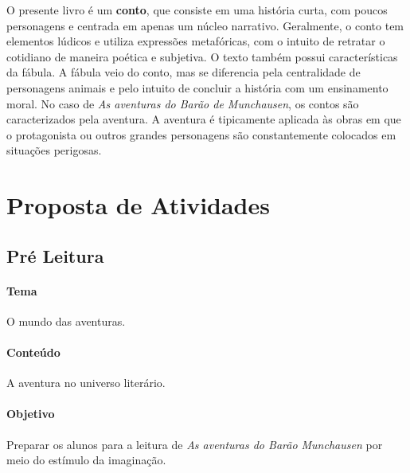 \documentclass[11pt]{extarticle}
\begin{document}
O presente livro é um \textbf{conto}, que consiste em uma história curta, com poucos personagens e centrada em apenas um núcleo narrativo. Geralmente, o conto tem elementos lúdicos e utiliza expressões metafóricas, com o intuito de retratar o cotidiano de maneira poética e subjetiva. O texto também possui características da fábula. A fábula veio do conto, mas se diferencia pela centralidade de personagens animais e pelo intuito de concluir a história com um ensinamento moral. No caso de \textit{As aventuras do Barão de Munchausen}, os contos são caracterizados pela aventura. A aventura é tipicamente aplicada às obras em que o protagonista ou outros grandes personagens são constantemente colocados em situações perigosas. 


\section{Proposta de Atividades}
\subsection{Pré Leitura}


\paragraph{Tema} O mundo das aventuras.  

\paragraph{Conteúdo} A aventura no universo literário. 

\paragraph{Objetivo} Preparar os alunos para a leitura de \textit{As aventuras do Barão Munchausen} por meio do estímulo da imaginação.
\end{document}

